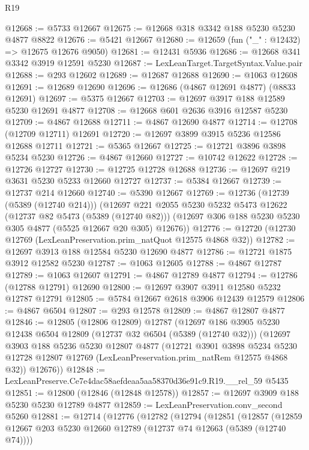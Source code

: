 \begin{lexlean}{R19}
\begin{coremodule}
@12668 := @5733 @12667
@12675 := @12668 @318 @3342 @188 @5230 @5230 @4877 @8822
@12676 := @5421 @12667
@12680 := @12659 (fun ("_" : @12432) => @12675 @12676 @9050)
@12681 := @12431 @5936
@12686 := @12668 @341 @3342 @3919 @12591 @5230
@12687 := LexLeanTarget.TargetSyntax.Value.pair
@12688 := @293 @12602
@12689 := @12687 @12688
@12690 := @1063 @12608
@12691 := @12689 @12690
@12696 := @12686 (@4867 @12691 @4877) (@8833 @12691)
@12697 := @5375 @12667
@12703 := @12697 @3917 @188 @12589 @5230 @12691 @4877
@12708 := @12668 @601 @2636 @3916 @12587 @5230
@12709 := @4867 @12688
@12711 := @4867 @12690 @4877
@12714 := @12708 (@12709 @12711) @12691
@12720 := @12697 @3899 @3915 @5236 @12586 @12688 @12711
@12721 := @5365 @12667
@12725 := @12721 @3896 @3898 @5234 @5230
@12726 := @4867 @12660
@12727 := @10742 @12622
@12728 := @12726 @12727
@12730 := @12725 @12728 @12688
@12736 := @12697 @219 @3631 @5230 @5233 @12660 @12727
@12737 := @5384 @12667
@12739 := @12737 @214 @12660
@12740 := @5390 @12667
@12769 := @12736
    (@12739 (@5389 (@12740 @214)))
    (@12697
      @221
      @2055
      @5230
      @5232
      @5473
      @12622
      (@12737 @82 @5473 (@5389 (@12740 @82)))
      (@12697 @306 @188 @5230 @5230 @305 @4877 (@5525 @12667 @20 @305) @12676))
@12776 := @12720 (@12730 @12769 (LexLeanPreservation.prim_natQuot @12575 @4868 @32))
@12782 := @12697 @3913 @188 @12584 @5230 @12690 @4877
@12786 := @12721 @1875 @3912 @12582 @5230
@12787 := @1063 @12605
@12788 := @4867 @12787
@12789 := @1063 @12607
@12791 := @4867 @12789 @4877
@12794 := @12786 (@12788 @12791) @12690
@12800 := @12697 @3907 @3911 @12580 @5232 @12787 @12791
@12805 := @5784 @12667 @2618 @3906 @12439 @12579
@12806 := @4867 @6504
@12807 := @293 @12578
@12809 := @4867 @12807 @4877
@12846 := @12805
    (@12806 @12809)
    @12787
    (@12697
      @186
      @3905
      @5230
      @12438
      @6504
      @12809
      (@12737 @32 @6504 (@5389 (@12740 @32)))
      (@12697
        @3903
        @188
        @5236
        @5230
        @12807
        @4877
        (@12721
          @3901
          @3898
          @5234
          @5230
          @12728
          @12807
          @12769
          (LexLeanPreservation.prim_natRem @12575 @4868 @32))
        @12676))
@12848 := LexLeanPreserve.Ce7e4dac58aefdeaa5aa58370d36e91c9.R19.__rel_59 @5435
@12851 := @12800 (@12846 (@12848 @12578))
@12857 := @12697 @3909 @188 @5230 @5230 @12789 @4877
@12859 := LexLeanPreservation.conv_second @5260
@12881 := @12714
    (@12776
      (@12782
        (@12794
          (@12851
            (@12857
              (@12859 @12667 @203 @5230 @12660 @12789 (@12737 @74 @12663 (@5389 (@12740 @74))))

\end{coremodule}
\end{lexlean}
